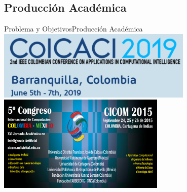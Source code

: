 \subsection{Producción Académica}
\begin{frame}{Problema y Objetivos}{Producción Académica}
\centering
\includegraphics[width=0.7\textwidth,height=0.7\textheight,keepaspectratio]{Figures/COLCACI.JPG}\\
\includegraphics[width=0.6\textwidth,height=0.6\textheight,keepaspectratio]{Figures/CICOM.JPG}
\end{frame}